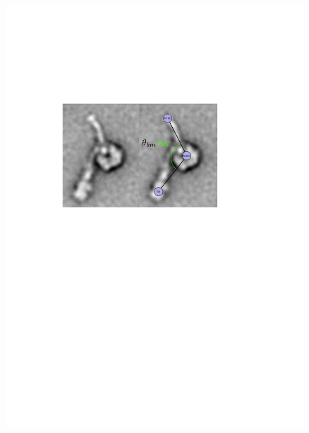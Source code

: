 \documentclass{article}
\begin{document}
\begin{figure}
\begin{minipage}{0.5\textwidth}
   \includegraphics[width=\linewidth]{figures/schematic-poststroke}
   \label{fig:poststrokeangle}
 \end{minipage}
 \begin{minipage}{\textwidth}
   \centering

\end{minipage}
\end{figure}
\end{document}
